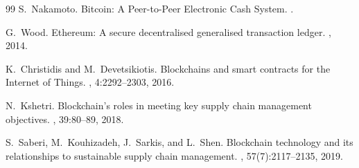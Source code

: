 \documentclass[11pt,a4paper]{article}
\theoremstyle{definition}
\theoremstyle{remark}
\begin{document}
\begin{thebibliography}{99}
S.~Nakamoto.
\newblock Bitcoin: A Peer-to-Peer Electronic Cash System.
.

G.~Wood.
\newblock Ethereum: A secure decentralised generalised transaction ledger.
, 2014.

K.~Christidis and M.~Devetsikiotis.
\newblock Blockchains and smart contracts for the Internet of Things.
, 4:2292--2303, 2016.

N.~Kshetri.
\newblock Blockchain's roles in meeting key supply chain management objectives.
, 39:80--89, 2018.

S.~Saberi, M.~Kouhizadeh, J.~Sarkis, and L.~Shen.
\newblock Blockchain technology and its relationships to sustainable supply chain management.
, 57(7):2117--2135, 2019.

\end{thebibliography}
\end{document}
